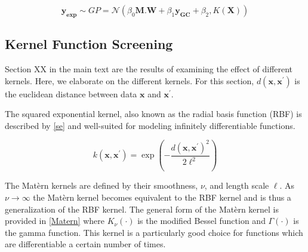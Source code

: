 \documentclass[journal=jacsat,manuscript=article]{achemso}
\begin{document}
\begin{equation}
    \mathbf{y_{\text{exp}}} \sim GP = \mathcal{N}\left( \beta_{0} \mathbf{M.W} + \beta_{1} \mathbf{y_{GC}} +\beta_{2} , K(\mathbf{X}) \right)
    \label{Method_5}
\end{equation}



\subsection{Kernel Function Screening}

Section XX in the main text are the results of examining the effect of different kernels. Here, we elaborate on the different kernels. For this section, $d(\mathbf{x}, \mathbf{x}^{\prime})$ is the euclidean distance between data $\mathbf{x}$ and $\mathbf{x}^{\prime}$.

The squared exponential kernel, also known as the radial basis function (RBF) is described by \eqref{se} and well-suited for modeling infinitely differentiable functions.

\begin{equation}
    k(\mathbf{x}, \mathbf{x}^{\prime}) = \exp\left(-\frac{d(\mathbf{x}, \mathbf{x}^{\prime})^2}{2\ell^2} \right)
    \label{se}
\end{equation}

The Mat\`ern kernels are defined by their smoothness, $\nu$, and length scale $\ell$. As $\nu \rightarrow \infty$ the Mat\`ern kernel becomes equivalent to the RBF kernel and is thus a generalization of the RBF kernel. The general form of the Mat\`ern kernel is provided in \eqref{Matern} where $K_\nu(\cdot)$ is the modified Bessel function and $\Gamma(\cdot)$ is the gamma function. This kernel is a particularly good choice for functions which are differentiable a certain number of times.
\end{document}
